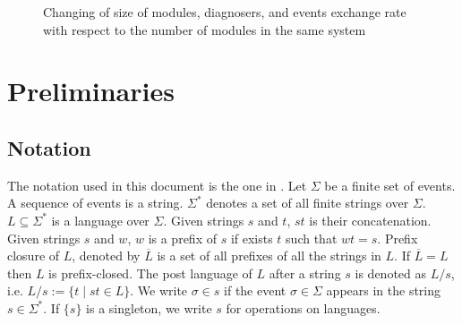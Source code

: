 \documentclass[a4paper, 10pt, conference]{ieeeconf}
\begin{document}
\begin{figure}
\caption{Changing of size of modules, diagnosers, and events exchange rate
with respect to the number of modules in the same system}
\label{fig:curves}
\end{figure}

\section{Preliminaries}
\label{sec:Preliminaries}

\subsection{Notation}
The notation used in this document is the one in
\cite{cassandras_introduction_2010}.
Let $\Sigma$ be a finite set of events. A sequence of events is a string.
$\Sigma^*$ denotes a set of all finite strings over $\Sigma$.
$L\subseteq\Sigma^*$ is a language over $\Sigma$. Given strings $s$ and $t$,
$st$ is their concatenation. Given strings $s$ and $w$, $w$ is a prefix of $s$
if exists $t$ such that $wt = s$. Prefix closure of $L$, denoted by
$\overline{L}$ is a set of all prefixes of all the strings in $L$.
If $\overline{L} = L$ then $L$ is prefix-closed. The post language of $L$ after
a string $s$ is denoted as $L/s$, i.e. $L/s := \{t\mid st \in L\}$. We
write $\sigma \in s$ if the event $\sigma \in \Sigma$ appears in the string $s
\in \Sigma^*$. If $\{s\}$ is a singleton, we write $s$ for operations on
languages.
\end{document}

